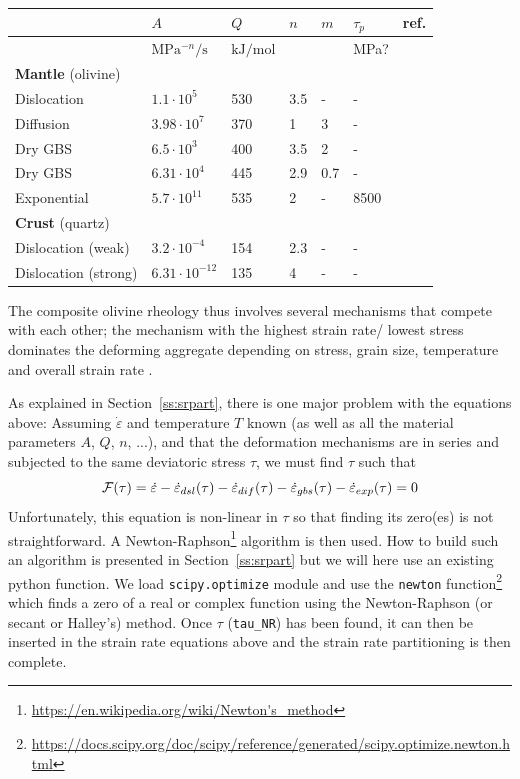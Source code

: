 \begin{center}
\begin{tabular}{lllllll}
\hline
& $A$ & $Q$ & $n$ & $m$ & $\tau_p$ & ref. \\
\hline\hline
 & $\si{\mega\pascal^{-n}\per\second}$ & $\si{\kilo\joule\per\mole}$ &&& \si{\mega\pascal}?\\
\textbf{Mantle} (olivine)  &  \\ 
Dislocation       & $1.1\cdot10^5$    &530& 3.5 & -  &-   &\cite{hiko03}\\
Diffusion         & $3.98\cdot 10^7$  &370& 1   & 3  &-   &\\
Dry GBS           & $6.5\cdot10^3$    &400& 3.5 & 2  &-   &\\
Dry GBS           & $6.31\cdot10^4$   &445& 2.9 & 0.7&-   &\cite{hazk11}\\
Exponential       & $5.7\cdot10^{11}$ &535& 2   & -  &8500&\cite{goet78}\\
\hline
\textbf{Crust} (quartz) &\\
Dislocation (weak)   &  $3.2\cdot10^{-4}$    & 154 & 2.3&- & - & \cite{kikr87}\\
Dislocation (strong) &  $6.31\cdot 10^{-12}$ & 135 & 4&- & - & \cite{hitd01}\\
\hline
\end{tabular}
\end{center}

The composite olivine rheology thus involves several mechanisms
that compete with each other; the mechanism with the highest strain rate/
lowest stress dominates the deforming aggregate depending on stress,
grain size, temperature and overall strain rate \cite{gupr14}.

As explained in Section~\ref{ss:srpart}, there is one major problem with the equations above: 
Assuming $\dot\varepsilon$ and temperature $T$ known (as well as all the material parameters $A$, $Q$, $n$, ...), 
and that the deformation mechanisms are in series and subjected to the same deviatoric stress $\tau$,
we must find $\tau$ such that 
\[
{\cal F}(\tau) = \dot\varepsilon -  \dot\varepsilon_{dsl}(\tau) 
-\dot\varepsilon_{dif}(\tau) -\dot\varepsilon_{gbs}(\tau) - \dot\varepsilon_{exp}(\tau) =0
\]
Unfortunately, this equation is non-linear in $\tau$ so that finding its zero(es) is not 
straightforward. A Newton-Raphson\footnote{\url{https://en.wikipedia.org/wiki/Newton's_method}} 
algorithm is then used. How to build such an algorithm is presented in Section~\ref{ss:srpart} 
but we will here use an existing python function. 
We load \lstinline{scipy.optimize} module and use the \lstinline{newton} function\footnote{\url{
https://docs.scipy.org/doc/scipy/reference/generated/scipy.optimize.newton.html}}
which finds a zero of a real or complex function using the Newton-Raphson (or secant or Halley’s) method.
Once $\tau$ (\lstinline{tau_NR}) has been found, it can then be inserted in the strain rate equations above and
the strain rate partitioning is then complete.

